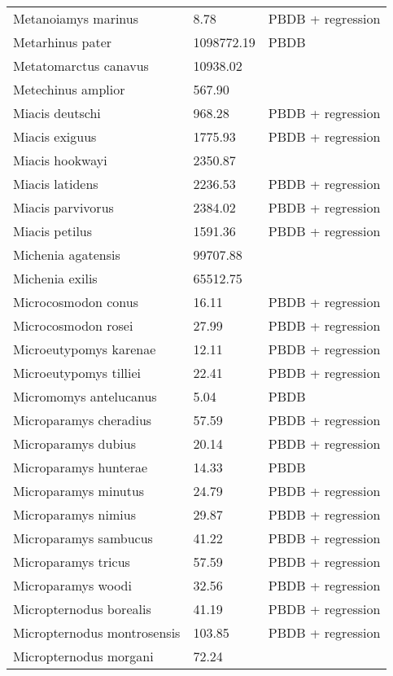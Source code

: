 \documentclass{article}
\begin{document}
\begin{center}
\begin{longtable}{p{} p{} p{} }
  Metanoiamys marinus & 8.78 & PBDB + regression \\ 
  Metarhinus pater & 1098772.19 & PBDB \\ 
  Metatomarctus canavus & 10938.02 & \cite{Tomiya2013} \\ 
  Metechinus amplior & 567.90 & \cite{Tedford1994} \\ 
  Miacis deutschi & 968.28 & PBDB + regression \\ 
  Miacis exiguus & 1775.93 & PBDB + regression \\ 
  Miacis hookwayi & 2350.87 & \cite{Patton1973} \\ 
  Miacis latidens & 2236.53 & PBDB + regression \\ 
  Miacis parvivorus & 2384.02 & PBDB + regression \\ 
  Miacis petilus & 1591.36 & PBDB + regression \\ 
  Michenia agatensis & 99707.88 & \cite{Tomiya2013} \\ 
  Michenia exilis & 65512.75 & \cite{Tomiya2013} \\ 
  Microcosmodon conus & 16.11 & PBDB + regression \\ 
  Microcosmodon rosei & 27.99 & PBDB + regression \\ 
  Microeutypomys karenae & 12.11 & PBDB + regression \\ 
  Microeutypomys tilliei & 22.41 & PBDB + regression \\ 
  Micromomys antelucanus & 5.04 & PBDB \\ 
  Microparamys cheradius & 57.59 & PBDB + regression \\ 
  Microparamys dubius & 20.14 & PBDB + regression \\ 
  Microparamys hunterae & 14.33 & PBDB \\ 
  Microparamys minutus & 24.79 & PBDB + regression \\ 
  Microparamys nimius & 29.87 & PBDB + regression \\ 
  Microparamys sambucus & 41.22 & PBDB + regression \\ 
  Microparamys tricus & 57.59 & PBDB + regression \\ 
  Microparamys woodi & 32.56 & PBDB + regression \\ 
  Micropternodus borealis & 41.19 & PBDB + regression \\ 
  Micropternodus montrosensis & 103.85 & PBDB + regression \\ 
  Micropternodus morgani & 72.24 & \cite{Tomiya2013} \\ 

\end{longtable}
\end{center}
\end{document}
